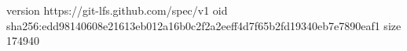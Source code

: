 version https://git-lfs.github.com/spec/v1
oid sha256:edd98140608e21613eb012a16b0c2f2a2eeff4d7f65b2fd19340eb7e7890eaf1
size 174940
